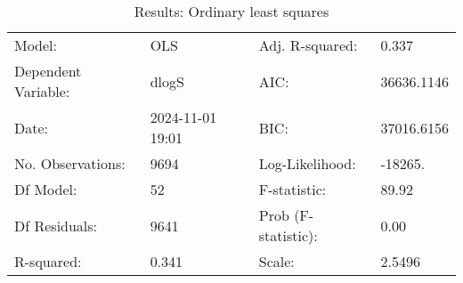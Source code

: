 \begin{table}
\caption{Results: Ordinary least squares}
\label{}
\begin{center}
\begin{tabular}{llll}
\hline
Model:              & OLS              & Adj. R-squared:     & 0.337       \\
Dependent Variable: & dlogS            & AIC:                & 36636.1146  \\
Date:               & 2024-11-01 19:01 & BIC:                & 37016.6156  \\
No. Observations:   & 9694             & Log-Likelihood:     & -18265.     \\
Df Model:           & 52               & F-statistic:        & 89.92       \\
Df Residuals:       & 9641             & Prob (F-statistic): & 0.00        \\
R-squared:          & 0.341            & Scale:              & 2.5496      \\
\hline
\end{tabular}
\end{center}


\end{table}
